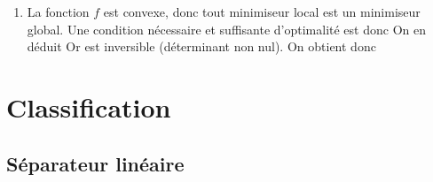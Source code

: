 \documentclass{article}
\begin{document}
\begin{enumerate}
	\item La fonction $f$ est convexe, donc tout minimiseur local est un minimiseur global. Une condition nécessaire et suffisante d'optimalité est donc 
	On en déduit
	Or
	est inversible (déterminant non nul). On obtient donc
\end{enumerate} 

\section{Classification}

\subsection{Séparateur linéaire}
\end{document}
